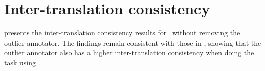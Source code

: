 \section{Inter-translation consistency}\label{appendix:ITC}

 presents the inter-translation consistency results for \ZhEn~without removing the outlier annotator. The findings remain consistent with those in , showing that the outlier annotator also has a higher inter-translation consistency when doing the task using \sxsmqm.






